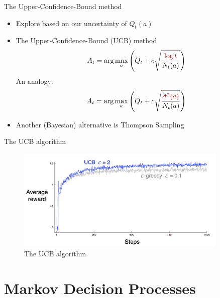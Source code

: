 \documentclass[10pt]{beamer}
\begin{document}
\begin{frame}{The Upper-Confidence-Bound method}

\begin{itemize}
\item Explore based on our uncertainty of $Q_t(a)$\pause
\item The Upper-Confidence-Bound (UCB) method
\[
A_t = \arg \max_a \left( Q_{t} + c \sqrt{\frac{{\color{uured} \log t}}{N_t(a)}}  \right)
\]
An analogy:
\[
A_t = \arg \max_a \left( Q_{t} + c \sqrt{\frac{{\color{uured}\hat{\sigma}^2(a)}}{N_t(a)}} \right)
\]
\item Another (Bayesian) alternative is {\color{uured}Thompson Sampling}
\end{itemize}

\end{frame}


\begin{frame}{The UCB algorithm}

\begin{figure}[h]
\centering
\includegraphics[width=0.9\textwidth]{fig/sutton_fig_2_4.png}
\caption{The UCB algorithm}
\end{figure}

\end{frame}








\section{Markov Decision Processes}
\end{document}
